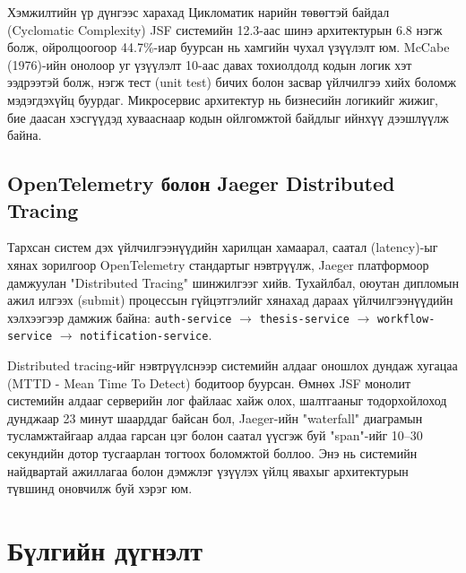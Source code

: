 
Хэмжилтийн үр дүнгээс харахад Цикломатик нарийн төвөгтэй байдал (Cyclomatic Complexity) JSF системийн 12.3-аас шинэ архитектурын 6.8 нэгж болж, ойролцоогоор 44.7\%-иар буурсан нь хамгийн чухал үзүүлэлт юм. McCabe (1976)-ийн онолоор уг үзүүлэлт 10-аас давах тохиолдолд кодын логик хэт ээдрээтэй болж, нэгж тест (unit test) бичих болон засвар үйлчилгээ хийх боломж мэдэгдэхүйц буурдаг. Микросервис архитектур нь бизнесийн логикийг жижиг, бие даасан хэсгүүдэд хувааснаар кодын ойлгомжтой байдлыг ийнхүү дээшлүүлж байна.

\subsection{OpenTelemetry болон Jaeger Distributed Tracing}

Тархсан систем дэх үйлчилгээнүүдийн харилцан хамаарал, саатал (latency)-ыг хянах зорилгоор OpenTelemetry стандартыг нэвтрүүлж, Jaeger платформоор дамжуулан "Distributed Tracing" шинжилгээг хийв. Тухайлбал, оюутан дипломын ажил илгээх (submit) процессын гүйцэтгэлийг хянахад дараах үйлчилгээнүүдийн хэлхээгээр дамжиж байна: \texttt{auth-service} $\rightarrow$ \texttt{thesis-service} $\rightarrow$ \texttt{workflow-service} $\rightarrow$ \texttt{notification-service}.


Distributed tracing-ийг нэвтрүүлснээр системийн алдааг оношлох дундаж хугацаа (MTTD - Mean Time To Detect) бодитоор буурсан. Өмнөх JSF монолит системийн алдааг серверийн лог файлаас хайж олох, шалтгааныг тодорхойлоход дунджаар 23 минут шаарддаг байсан бол, Jaeger-ийн "waterfall" диаграмын тусламжтайгаар алдаа гарсан цэг болон саатал үүсгэж буй "span"-ийг 10--30 секундийн дотор тусгаарлан тогтоох боломжтой боллоо. Энэ нь системийн найдвартай ажиллагаа болон дэмжлэг үзүүлэх үйлц явахыг архитектурын түвшинд оновчилж буй хэрэг юм.

\section{Бүлгийн дүгнэлт}

